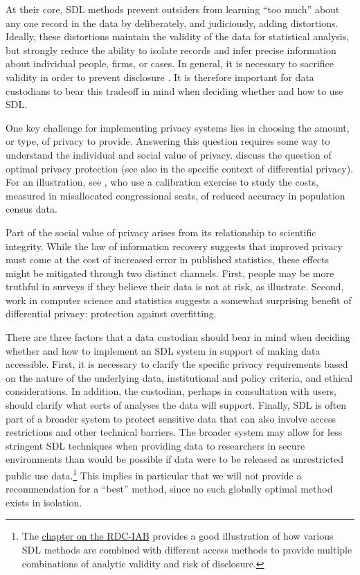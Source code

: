 \documentclass[
]{book}
\begin{document}
At their core, SDL methods prevent outsiders from learning ``too much'' about any one record in the data \citep{dalenius_towards_1977} by deliberately, and judiciously, adding distortions. Ideally, these distortions maintain the validity of the data for statistical analysis, but strongly reduce the ability to isolate records and infer precise information about individual people, firms, or cases. In general, it is necessary to sacrifice validity in order to prevent disclosure \citep{goroff_balancing_2015, abowd_economic_2015}. It is therefore important for data custodians to bear this tradeoff in mind when deciding whether and how to use SDL.

One key challenge for implementing privacy systems lies in choosing the amount, or type, of privacy to provide. Answering this question requires some way to understand the individual and social value of privacy. \citet{abowd_economic_2019} discuss the question of optimal privacy protection (see also \citet{hsu_differential_2014} in the specific context of differential privacy). For an illustration, see \citet{spencer_effects_2015}, who use a calibration exercise to study the costs, measured in misallocated congressional seats, of reduced accuracy in population census data.

Part of the social value of privacy arises from its relationship to scientific integrity. While the law of information recovery suggests that improved privacy must come at the cost of increased error in published statistics, these effects might be mitigated through two distinct channels.
First, people may be more truthful in surveys if they believe their data is not at risk, as \citet{couper_risk_2008} illustrate. Second, work in computer science and statistics \citep{dwork_generalization_2015, dwork_fienberg_2018, cummings_adaptive_2016} suggests a somewhat surprising benefit of differential privacy: protection against overfitting.

There are three factors that a data custodian should bear in mind when deciding whether and how to implement an SDL system in support of making data accessible. First, it is necessary to clarify the specific privacy requirements based on the nature of the underlying data, institutional and policy criteria, and ethical considerations. In addition, the custodian, perhaps in consultation with users, should clarify what sorts of analyses the data will support. Finally, SDL is often part of a broader system to protect sensitive data that can also involve access restrictions and other technical barriers. The broader system may allow for less stringent SDL techniques when providing data to researchers in secure environments than would be possible if data were to be released as unrestricted public use data.\footnote{The \protect\hyperlink{iab}{chapter on the RDC-IAB} provides a good illustration of how various SDL methods are combined with different access methods to provide multiple combinations of analytic validity and risk of disclosure.} This implies in particular that we will not provide a recommendation for a ``best'' method, since no such globally optimal method exists in isolation.
\end{document}
